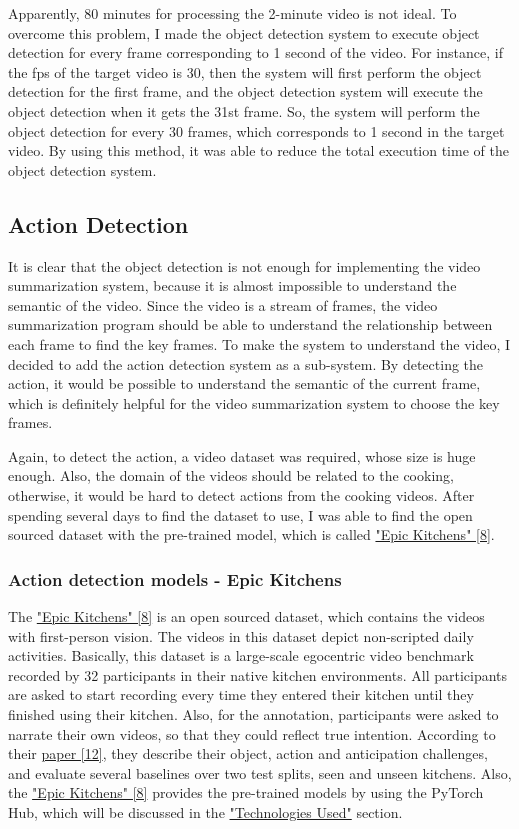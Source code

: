 \documentclass{article}
\begin{document}
Apparently, 80 minutes for processing the 2-minute video is not ideal. To overcome this problem, I made the object detection system to execute object detection for every frame corresponding to 1 second of the video. For instance, if the fps of the target video is 30, then the system will first perform the object detection for the first frame, and the object detection system will execute the object detection when it gets the 31st frame. So, the system will perform the object detection for every 30 frames, which corresponds to 1 second in the target video. By using this method, it was able to reduce the total execution time of the object detection system.

\subsection{Action Detection}

It is clear that the object detection is not enough for implementing the video summarization system, because it is almost impossible to understand the semantic of the video. Since the video is a stream of frames, the video summarization program should be able to understand the relationship between each frame to find the key frames. To make the system to understand the video, I decided to add the action detection system as a sub-system. By detecting the action, it would be possible to understand the semantic of the current frame, which is definitely helpful for the video summarization system to choose the key frames.

Again, to detect the action, a video dataset was required, whose size is huge enough. Also, the domain of the videos should be related to the cooking, otherwise, it would be hard to detect actions from the cooking videos. After spending several days to find the dataset to use, I was able to find the open sourced dataset with the pre-trained model, which is called \hyperlink{ref8}{"Epic Kitchens" [8]}.

\subsubsection{Action detection models - Epic Kitchens}

The \hyperlink{ref8}{"Epic Kitchens" [8]} is an open sourced dataset, which contains the videos with first-person vision. The videos in this dataset depict non-scripted daily activities. Basically, this dataset is  a large-scale egocentric video benchmark recorded by 32 participants in their native kitchen environments. All participants are asked to start recording every time they entered their kitchen until they finished using their kitchen. Also, for the annotation, participants were asked to narrate their own videos, so that they could reflect true intention. According to their \hyperlink{ref12}{paper [12]}, they describe their object, action and anticipation challenges, and evaluate several baselines over two test splits, seen and unseen kitchens. Also, the \hyperlink{ref8}{"Epic Kitchens" [8]} provides the pre-trained models by using the PyTorch Hub, which will be discussed in the \hyperlink{actionDetection_used}{"Technologies Used"} section.
\end{document}
